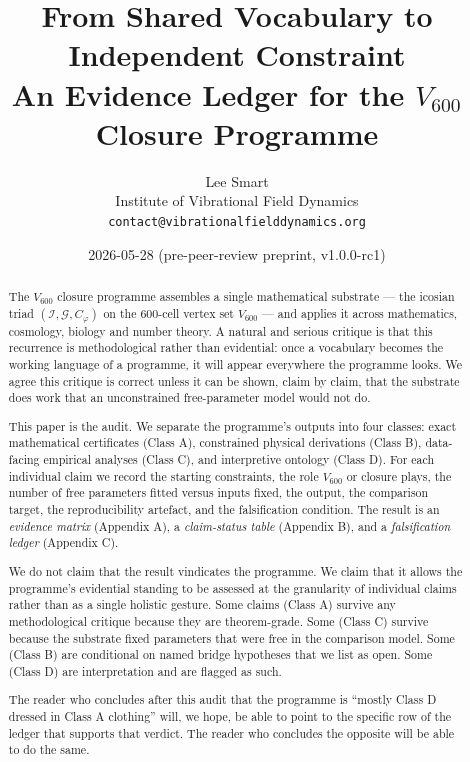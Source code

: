 \documentclass[11pt,a4paper]{article}
\title{\textbf{From Shared Vocabulary to Independent Constraint}\\[0.4em]
\large An Evidence Ledger for the $V_{600}$ Closure Programme}
\author{Lee Smart\\
\small Institute of Vibrational Field Dynamics\\
\small \texttt{contact@vibrationalfielddynamics.org}}
\date{2026-05-28 \quad (pre-peer-review preprint, v1.0.0-rc1)}
\newcommand{\II}{\mathcal{I}}
\newcommand{\Vsix}{V_{600}}
\newcommand{\Cphi}{C_\varphi}
\begin{document}
\maketitle

\begin{abstract}
\noindent
The $V_{600}$ closure programme assembles a single mathematical
substrate --- the icosian triad $(\II,\mathcal{G},\Cphi)$ on the
$600$-cell vertex set $\Vsix$ --- and applies it across mathematics,
cosmology, biology and number theory. A natural and serious critique
is that this recurrence is methodological rather than evidential:
once a vocabulary becomes the working language of a programme, it
will appear everywhere the programme looks. We agree this critique
is correct unless it can be shown, claim by claim, that the
substrate does work that an unconstrained free-parameter model would
not do.

This paper is the audit. We separate the programme's outputs into
four classes: exact mathematical certificates (Class A), constrained
physical derivations (Class B), data-facing empirical analyses
(Class C), and interpretive ontology (Class D). For each individual
claim we record the starting constraints, the role $\Vsix$ or
closure plays, the number of free parameters fitted versus inputs
fixed, the output, the comparison target, the reproducibility
artefact, and the falsification condition. The result is an
\emph{evidence matrix} (Appendix A), a \emph{claim-status table}
(Appendix B), and a \emph{falsification ledger} (Appendix C).

We do not claim that the result vindicates the programme. We claim
that it allows the programme's evidential standing to be assessed at
the granularity of individual claims rather than as a single
holistic gesture. Some claims (Class A) survive any methodological
critique because they are theorem-grade. Some (Class C) survive
because the substrate fixed parameters that were free in the
comparison model. Some (Class B) are conditional on named bridge
hypotheses that we list as open. Some (Class D) are interpretation
and are flagged as such.

The reader who concludes after this audit that the programme is
``mostly Class D dressed in Class A clothing'' will, we hope, be
able to point to the specific row of the ledger that supports that
verdict. The reader who concludes the opposite will be able to do
the same.
\end{abstract}

\bigskip
\end{document}
